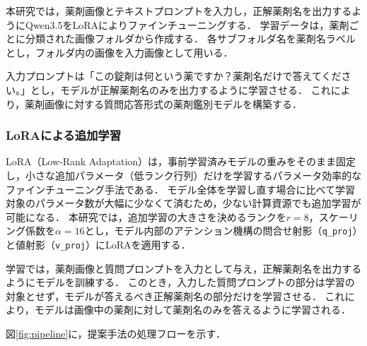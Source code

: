 \documentclass[dvipdfmx]{jsarticle}
\begin{document}
本研究では，薬剤画像とテキストプロンプトを入力し，正解薬剤名を出力するようにQwen3.5をLoRAによりファインチューニングする．
学習データは，薬剤ごとに分類された画像フォルダから作成する．
各サブフォルダ名を薬剤名ラベルとし，フォルダ内の画像を入力画像として用いる．

入力プロンプトは「この錠剤は何という薬ですか？薬剤名だけで答えてください。」とし，モデルが正解薬剤名のみを出力するように学習させる．
これにより，薬剤画像に対する質問応答形式の薬剤鑑別モデルを構築する．

\subsubsection{LoRAによる追加学習}

LoRA（Low-Rank Adaptation）は，事前学習済みモデルの重みをそのまま固定し，小さな追加パラメータ（低ランク行列）だけを学習するパラメータ効率的なファインチューニング手法である．
モデル全体を学習し直す場合に比べて学習対象のパラメータ数が大幅に少なくて済むため，少ない計算資源でも追加学習が可能になる．
本研究では，追加学習の大きさを決めるランクを$r=8$，スケーリング係数を$\alpha=16$とし，モデル内部のアテンション機構の問合せ射影（\texttt{q\_proj}）と値射影（\texttt{v\_proj}）にLoRAを適用する．

学習では，薬剤画像と質問プロンプトを入力として与え，正解薬剤名を出力するようにモデルを訓練する．
このとき，入力した質問プロンプトの部分は学習の対象とせず，モデルが答えるべき正解薬剤名の部分だけを学習させる．
これにより，モデルは画像中の薬剤に対して薬剤名のみを答えるように学習される．

図\ref{fig:pipeline}に，提案手法の処理フローを示す．
\end{document}
